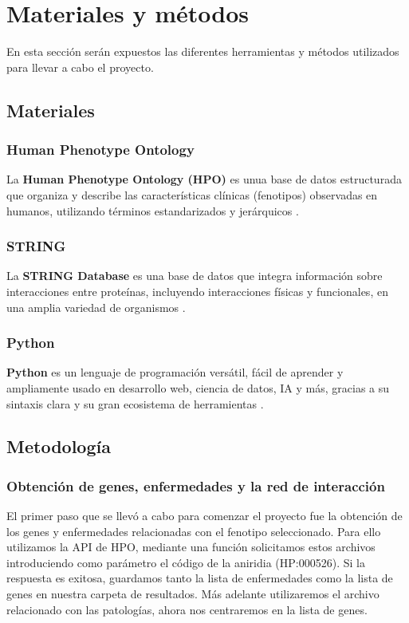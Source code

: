 \section{Materiales y métodos}

En esta sección serán expuestos las diferentes herramientas y métodos utilizados para llevar a cabo el proyecto.

\subsection{\textbf{Materiales}}
\subsubsection{Human Phenotype Ontology}

La \textbf{Human Phenotype Ontology (HPO)} es unua base de datos estructurada que organiza y describe las características clínicas (fenotipos) observadas en humanos, utilizando términos estandarizados y jerárquicos \cite{Gargano2024}.

\subsubsection{STRING}

La \textbf{STRING Database} es una base de datos que integra información sobre interacciones entre proteínas, incluyendo interacciones físicas y funcionales, en una amplia variedad de organismos \cite{STRING2024}.

\subsubsection{Python}

\textbf{Python} es un lenguaje de programación versátil, fácil de aprender y ampliamente usado en desarrollo web, ciencia de datos, IA y más, gracias a su sintaxis clara y su gran ecosistema de herramientas \cite{Python2024}.


\subsection{\textbf{Metodología}}

\subsubsection{Obtención de genes, enfermedades y la red de interacción}
El primer paso que se llevó a cabo para comenzar el proyecto fue la obtención de los genes y enfermedades relacionadas con el fenotipo seleccionado. Para ello utilizamos la API de HPO, mediante una función solicitamos estos archivos introduciendo como parámetro el código de la aniridia (HP:000526). Si la respuesta es exitosa, guardamos tanto la lista de enfermedades como la lista de genes en nuestra carpeta de resultados. Más adelante utilizaremos el archivo relacionado con las patologías, ahora nos centraremos en la lista de genes.

